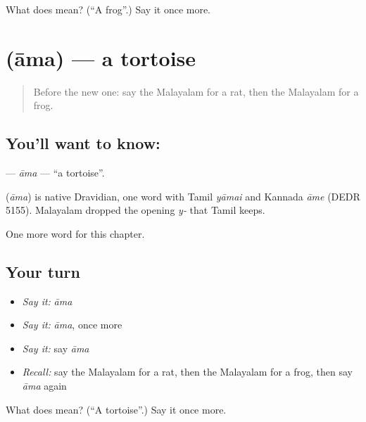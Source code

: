\begin{tcolorbox}[breakable,colback=teal!4,colframe=teal!35!black,title={Before you move on}]
What does  mean? (\textquotedblleft{}A frog\textquotedblright{}.) Say it once more.
\end{tcolorbox}
\section[\texorpdfstring{\ml{ആമ} (āma)}{ആമ (āma)}]{ (āma) — a tortoise}

\label{lesson:ML-C152-ama}



\begin{quote}
Before the new one: say the Malayalam for a rat, then the Malayalam for a frog.
\end{quote}

\subsection*{You'll want to know: }
\textbf{} — \emph{āma} — \textquotedblleft{}a tortoise\textquotedblright{}.

\begin{cousinweb}
\textbf{} (\emph{āma}) is native Dravidian, one word with Tamil \emph{yāmai} and Kannada \emph{āme} (DEDR 5155). Malayalam dropped the opening \emph{y-} that Tamil keeps.
\end{cousinweb}

\begin{grammarlens}[title={What you've built}]
One more word for this chapter.
\end{grammarlens}

\subsection*{Your turn}
\begin{itemize}
\raggedright
  \item \emph{Say it:} \emph{āma}
  \item \emph{Say it:} \emph{āma}, once more
  \item \emph{Say it:} say \emph{āma}
  \item \emph{Recall:} say the Malayalam for a rat, then the Malayalam for a frog, then say \emph{āma} again
\end{itemize}

\begin{tcolorbox}[breakable,colback=teal!4,colframe=teal!35!black,title={Before you move on}]
What does  mean? (\textquotedblleft{}A tortoise\textquotedblright{}.) Say it once more.
\end{tcolorbox}
